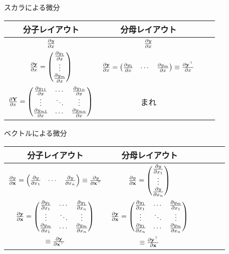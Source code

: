 \documentclass[dvipdfmx,notheorems,t]{beamer}
\begin{document}
\begin{frame}{スカラによる微分}
\begin{table}[h]
  \centering
  \begin{tabular}{ScSc}
    分子レイアウト & 分母レイアウト \\ \hline
    $\pdv{y}{x}$ & $\pdv{y}{x}$ \\ \hline
    $\pdv{\vb{y}}{x} = \mqty(\pdv{y_1}{x} \\ \vdots \\ \pdv{y_m}{x})$
      & $\pdv{\vb{y}}{x} = \mqty(\pdv{y_1}{x} & \cdots & \pdv{y_m}{x}) \equiv \pdv{\vb{y}^\top}{x} $ \\ \hline
    $\pdv{\vb{Y}}{x} = \mqty(\pdv{y_{11}}{x} & \cdots & \pdv{y_{1n}}{x} \\
      \vdots & \ddots & \vdots \\
      \pdv{y_{m1}}{x} & \cdots & \pdv{y_{mn}}{x})$ & まれ
  \end{tabular}
\end{table}
\end{frame}

\begin{frame}{ベクトルによる微分}
\begin{table}[h]
  \centering
  \begin{tabular}{ScSc}
    分子レイアウト & 分母レイアウト \\ \hline
    $\pdv{y}{\vb{x}} = \mqty(\pdv{y}{x_1} & \cdots & \pdv{y}{x_n}) \equiv \pdv{y}{\vb{x}^\top}$
      & $\pdv{y}{\vb{x}} = \mqty(\pdv{y}{x_1} \\ \vdots \\ \pdv{y}{x_n})$ \\ \hline
    $\pdv{\vb{y}}{\vb{x}} = \mqty(\pdv{y_1}{x_1} & \cdots & \pdv{y_1}{x_n} \\
      \vdots & \ddots & \vdots \\
      \pdv{y_m}{x_1} & \cdots & \pdv{y_m}{x_n})$
      & $\pdv{\vb{y}}{\vb{x}} = \mqty(\pdv{y_1}{x_1} & \cdots & \pdv{y_m}{x_1} \\
      \vdots & \ddots & \vdots \\
      \pdv{y_1}{x_n} & \cdots & \pdv{y_m}{x_n})$ \\
    $\equiv \pdv{\vb{y}}{\vb{x}^\top}$ & $ \equiv \pdv{\vb{y}^\top}{\vb{x}}$
  \end{tabular}
\end{table}
\end{frame}
\end{document}
